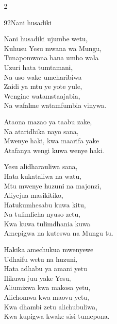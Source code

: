 \begin{multicols}{2}
\begin{hymn}{92}{Nani husadiki}{}
\begin{stanza}
Nani husadiki ujumbe wetu,\\
Kuhusu Yesu mwana wa Mungu,\\
Tunapomwona hana umbo wala\\
Uzuri hata tumtamani,\\
Na uso wake umeharibiwa\\
Zaidi ya mtu ye yote yule,\\
Wengine watamstaajabia,\\
Na wafalme watamfumbia vinywa.
\end{stanza}
\begin{chorus}
Ataona mazao ya taabu zake,\\
Na ataridhika nayo sana,\\
Mwenye haki, kwa maarifa yake\\
Atafanya wengi kuwa wenye haki.
\end{chorus}
\begin{stanza}
Yesu alidharauliwa sana,\\
Hata kukataliwa na watu,\\
Mtu mwenye huzuni na majonzi,\\
Aliyejua masikitiko,\\
Hatukumhesabu kuwa kitu,\\
Na tulimficha nyuso zetu,\\
Kwa kuwa tulimdhania kuwa\\
Amepigwa na kuteswa na Mungu tu.
\end{stanza}
\begin{stanza}
Hakika amechukua mwenyewe\\
Udhaifu wetu na huzuni,\\
Hata adhabu ya amani yetu\\
Ilikuwa juu yake Yesu,\\
Aliumizwa kwa makosa yetu,\\
Alichomwa kwa maovu yetu,\\
Kwa dhambi zetu alichubuliwa,\\
Kwa kupigwa kwake sisi tumepona.
\end{stanza}
\end{hymn}


\end{multicols}
